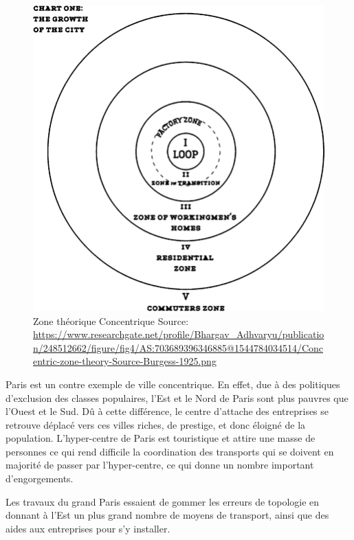 \begin{figure}
    \centering
    \includegraphics[scale=0.30]{media/Concentric-zone-theory-Source-Burgess-1925.png}
    \caption{
    Zone théorique Concentrique\newline
        \tiny{Source:\newline
          \url{https://www.researchgate.net/profile/Bhargav_Adhvaryu/publication/248512662/figure/fig4/AS:703689396346885@1544784034514/Concentric-zone-theory-Source-Burgess-1925.png}
        }
    }
    \label{fig:concentric-zone-theory}
\end{figure}

Paris est un contre exemple de ville concentrique. En effet, due à des politiques d'exclusion des classes populaires,
l'Est et le Nord de Paris sont plus pauvres que l'Ouest et le Sud.
Dû à cette différence, le centre d'attache des entreprises se retrouve déplacé vers ces villes riches, de prestige,
et donc éloigné de la population.
L'hyper-centre de Paris est touristique et attire une masse de personnes ce qui rend difficile la coordination des
transports qui se doivent en majorité de passer par l'hyper-centre, ce qui donne un nombre important d'engorgements.

Les travaux du grand Paris essaient de gommer les erreurs de topologie en donnant à l'Est un plus grand nombre de moyens de
transport, ainsi que des aides aux entreprises pour s'y installer.

